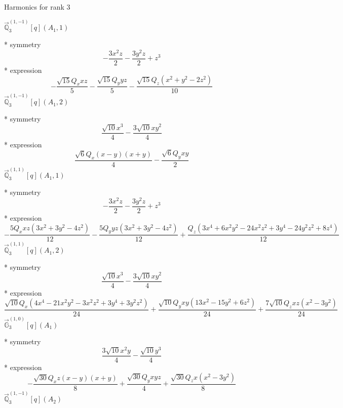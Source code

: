 \documentclass[fleqn,8pt]{jsarticle}
\begin{document}
\noindent * Harmonics for rank 3

\noindent\quad $\vec{\mathbb{Q}}_{3}^{(1,-1)}[q](A_{1},1)$

\noindent\quad ** symmetry
\begin{dmath*}
- \frac{3 x^{2} z}{2} - \frac{3 y^{2} z}{2} + z^{3}
\end{dmath*}
\noindent\quad ** expression
\begin{dmath*}
- \frac{\sqrt{15} Q_{x} x z}{5} - \frac{\sqrt{15} Q_{y} y z}{5} - \frac{\sqrt{15} Q_{z} \left(x^{2} + y^{2} - 2 z^{2}\right)}{10}
\end{dmath*}
\noindent\quad $\vec{\mathbb{Q}}_{3}^{(1,-1)}[q](A_{1},2)$

\noindent\quad ** symmetry
\begin{dmath*}
\frac{\sqrt{10} x^{3}}{4} - \frac{3 \sqrt{10} x y^{2}}{4}
\end{dmath*}
\noindent\quad ** expression
\begin{dmath*}
\frac{\sqrt{6} Q_{x} \left(x - y\right) \left(x + y\right)}{4} - \frac{\sqrt{6} Q_{y} x y}{2}
\end{dmath*}
\noindent\quad $\vec{\mathbb{Q}}_{3}^{(1,1)}[q](A_{1},1)$

\noindent\quad ** symmetry
\begin{dmath*}
- \frac{3 x^{2} z}{2} - \frac{3 y^{2} z}{2} + z^{3}
\end{dmath*}
\noindent\quad ** expression
\begin{dmath*}
- \frac{5 Q_{x} x z \left(3 x^{2} + 3 y^{2} - 4 z^{2}\right)}{12} - \frac{5 Q_{y} y z \left(3 x^{2} + 3 y^{2} - 4 z^{2}\right)}{12} + \frac{Q_{z} \left(3 x^{4} + 6 x^{2} y^{2} - 24 x^{2} z^{2} + 3 y^{4} - 24 y^{2} z^{2} + 8 z^{4}\right)}{12}
\end{dmath*}
\noindent\quad $\vec{\mathbb{Q}}_{3}^{(1,1)}[q](A_{1},2)$

\noindent\quad ** symmetry
\begin{dmath*}
\frac{\sqrt{10} x^{3}}{4} - \frac{3 \sqrt{10} x y^{2}}{4}
\end{dmath*}
\noindent\quad ** expression
\begin{dmath*}
\frac{\sqrt{10} Q_{x} \left(4 x^{4} - 21 x^{2} y^{2} - 3 x^{2} z^{2} + 3 y^{4} + 3 y^{2} z^{2}\right)}{24} + \frac{\sqrt{10} Q_{y} x y \left(13 x^{2} - 15 y^{2} + 6 z^{2}\right)}{24} + \frac{7 \sqrt{10} Q_{z} x z \left(x^{2} - 3 y^{2}\right)}{24}
\end{dmath*}
\noindent\quad $\vec{\mathbb{G}}_{3}^{(1,0)}[q](A_{1})$

\noindent\quad ** symmetry
\begin{dmath*}
\frac{3 \sqrt{10} x^{2} y}{4} - \frac{\sqrt{10} y^{3}}{4}
\end{dmath*}
\noindent\quad ** expression
\begin{dmath*}
- \frac{\sqrt{30} Q_{x} z \left(x - y\right) \left(x + y\right)}{8} + \frac{\sqrt{30} Q_{y} x y z}{4} + \frac{\sqrt{30} Q_{z} x \left(x^{2} - 3 y^{2}\right)}{8}
\end{dmath*}
\noindent\quad $\vec{\mathbb{Q}}_{3}^{(1,-1)}[q](A_{2})$
\end{document}
